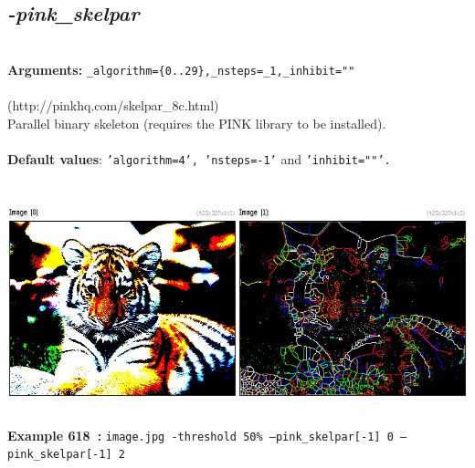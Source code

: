 \documentclass[a4paper,11pt,twoside]{book}
\begin{document}
\subsection{\emph{-pink\_skelpar} }\vspace*{-0.5em}
~\\\textbf{Arguments: } 
{\small \texttt{\_algorithm=\{0..29\},\_nsteps=\_1,\_inhibit=""}}\\~\\
(http://pinkhq.com/skelpar\_8c.html)
~\\Parallel binary skeleton (requires the PINK library to be installed).
~\\~\\\textbf{Default values}: {\small \texttt{'algorithm=4', 'nsteps=-1'} and \texttt{'inhibit=""'.}}
\begin{center}\includegraphics[keepaspectratio=true,height=7cm,width=\textwidth]{img/gmic_def618.jpg}\\
{\footnotesize \textbf{Example 618~:} \texttt{image.jpg -threshold 50\% --pink\_skelpar[-1] 0 --pink\_skelpar[-1] 2}}
\end{center}
\end{document}
